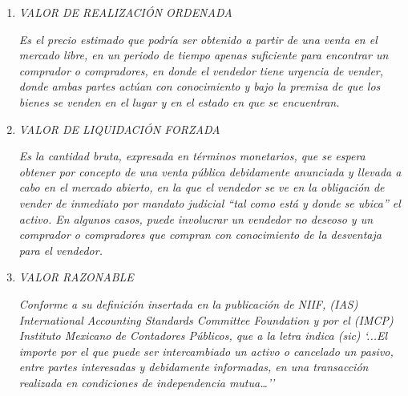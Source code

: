 \begin{enumerate}
\textit{Es el importe con que un rengl\'on contable aparece registrado en los libros de contabilidad, ya sea que represente el costo, inicial, el actualizado, el estimado o el de aval\'uo. Representa el valor con que se registra en los libros de contabilidad cualquier propiedad, derecho, bien, cr\'edito u obligaci\'on. El valor en libros representa \'unicamente ``cifras en libros'' y eso puede ser diferente del valor comercial, del valor en el mercado, del valor real, del valor de reposici\'on, del valor de liquidaci\'on, etc.}

\item \textcolor{principal}{\textit{VALOR DE REALIZACI\'ON ORDENADA}}

\textit{Es el precio estimado que podr\'ia ser obtenido a partir de una venta en el mercado libre, en un periodo de tiempo apenas suficiente para encontrar un comprador o compradores, en donde el vendedor tiene urgencia de vender, donde ambas partes act\'uan con conocimiento y bajo la premisa de que los bienes se venden en el lugar y en el estado en que se encuentran.}

\item \textcolor{principal}{ \textit{VALOR DE LIQUIDACI\'ON FORZADA}}

\textit{Es la cantidad bruta, expresada en t\'erminos monetarios, que se espera obtener por concepto de una venta p\'ublica debidamente anunciada y llevada a cabo en el mercado abierto, en la que el vendedor se ve en la obligaci\'on de vender de inmediato por mandato judicial ``tal como est\'a y donde se ubica'' el activo. En algunos casos, puede involucrar un vendedor no deseoso y un comprador o compradores que compran con conocimiento de la desventaja para el vendedor.}

\item \textcolor{principal}{ \textit{VALOR RAZONABLE}}

\textit{Conforme a su definici\'on insertada en la publicaci\'on de NIIF, (IAS) International Accounting Standards Committee Foundation y por el (IMCP) Instituto Mexicano de Contadores P\'ublicos, que a la letra indica (sic)  `...El importe por el que puede ser intercambiado un activo o cancelado un pasivo, entre partes interesadas y debidamente informadas, en una transacción realizada en condiciones de independencia mutua…''}

\end{enumerate}
